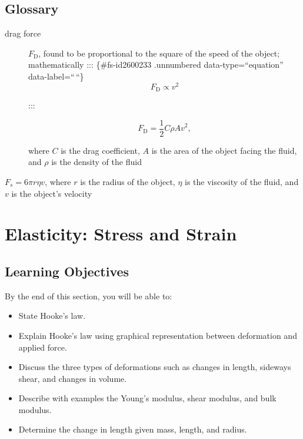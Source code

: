 \documentclass[
]{book}
\providecommand{\tightlist}{%
  \setlength{\itemsep}{0pt}\setlength{\parskip}{0pt}}
\begin{document}
\hypertarget{glossary-18}{%
\subsection{Glossary}\label{glossary-18}}

\begin{description}
\item[drag force]
\(F_{\text{D}}{}\), found to be proportional to the square of the
speed of the object; mathematically
::: \{\#fs-id2600233 .unnumbered data-type=``equation'' data-label=``\,``\}
\[{{F_{\text{D}} \propto}v^{\text{2}}}{}\]

:::

\leavevmode{}%
\[{{F_{\text{D}} = \frac{1}{2}}{C\rho}{Av}^{2},}{}\]

where \(C{}\) is the drag coefficient, \(A{}\) is the area of the object
facing the fluid, and \(\rho{}\) is the density of the fluid
\end{description}

\begin{description}
\tightlist
\item[Stokes' law]
\({F_{s} = 6{\pi r\eta v}}{}\), where \(r\) is the radius of the object,
\(\eta\) is the viscosity of the fluid, and \(v\) is the object's
velocity
\end{description}

\hypertarget{elasticity-stress-and-strain}{%
\section{Elasticity: Stress and Strain}\label{elasticity-stress-and-strain}}

\hypertarget{import-auto-id0000032}{}
\hypertarget{learning-objectives-22}{%
\subsection{Learning Objectives}\label{learning-objectives-22}}

By the end of this section, you will be able to:

\begin{itemize}
\tightlist
\item
  State Hooke's law.
\item
  Explain Hooke's law using graphical representation between
  deformation and applied force.
\item
  Discuss the three types of deformations such as changes in length,
  sideways shear, and changes in volume.
\item
  Describe with examples the Young's modulus, shear modulus, and bulk
  modulus.
\item
  Determine the change in length given mass, length, and radius.
\end{itemize}
\end{document}
